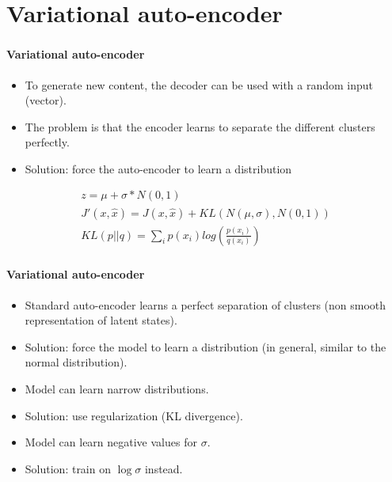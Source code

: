 \documentclass[xcolor=table]{beamer}
\begin{document}
\section{Variational auto-encoder}

\begin{frame}
	\frametitle{\inserttitle}
	\framesubtitle{Variational auto-encoder}

\begin{itemize}
	\item To generate new content, the decoder can be used with a random input (vector).
	\item The problem is that the encoder learns to separate the different clusters perfectly.
	\item Solution: force the auto-encoder to learn a distribution 
\end{itemize}

\begin{minipage}{0.60\textwidth} 
	\begin{align*}
	z = \mu + \sigma * N(0, 1) \\
	J'(x, \hat{x}) = J(x, \hat{x}) + KL(N(\mu, \sigma), N(0, 1)) \\
	KL(p||q) = \sum_i p(x_i) log(\frac{p(x_i)}{q(x_i)})
	\end{align*}
\end{minipage}
%
\begin{minipage}{0.39\textwidth}
\end{minipage}

\end{frame}

\begin{frame}
	\frametitle{\inserttitle}
	\framesubtitle{Variational auto-encoder}

\begin{itemize}
	\item Standard auto-encoder learns a perfect separation of clusters (non smooth representation of latent states).
	\item Solution: force the model to learn a distribution (in general, similar to the normal distribution).
	\item Model can learn narrow distributions.
	\item Solution: use regularization (KL divergence).
	\item Model can learn negative values for $\sigma$.
	\item Solution: train on $\log \sigma$ instead.
\end{itemize}

\end{frame}

\end{document}
